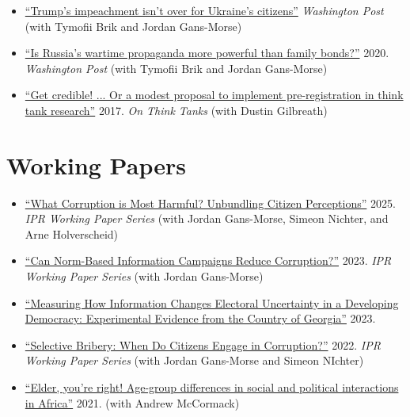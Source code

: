 \begin{itemize}[label={---},leftmargin=1.5em]
  \item \href{https://www.washingtonpost.com/politics/2020/02/19/trumps-impeachment-isnt-over-ukraines-citizens/}{``Trump’s impeachment isn’t over for Ukraine’s citizens''} \textit{Washington Post} (with Tymofii Brik and Jordan Gans-Morse)

  \item \href{https://www.washingtonpost.com/politics/2022/06/20/russia-ukraine-relatives-conversations-propaganda/}{``Is Russia’s wartime propaganda more powerful than family bonds?''} 2020. \textit{Washington Post} (with Tymofii Brik and Jordan Gans-Morse)

  \item \href{https://crrc-caucasus.blogspot.com/2017/09/get-credible-or-modest-proposal-to.html}{``Get credible! ... Or a modest proposal to implement pre-registration in think tank research''} 2017. \textit{On Think Tanks} (with Dustin Gilbreath)

\end{itemize}

\section{\sc Working Papers}

\begin{itemize}[label={---},leftmargin=1.5em]
  \item \href{https://www.ipr.northwestern.edu/documents/working-papers/2025/wp-25-02.pdf}{``What Corruption is Most Harmful? Unbundling Citizen Perceptions''} 2025. \textit{IPR Working Paper Series} (with Jordan Gans-Morse, Simeon Nichter, and Arne Holverscheid)

  \item \href{https://www.ipr.northwestern.edu/documents/working-papers/2023/wp-23-33.pdf}{``Can Norm-Based Information Campaigns Reduce Corruption?''} 2023. \textit{IPR Working Paper Series} (with Jordan Gans-Morse)

  \item \href{https://osf.io/mwg7u_v1/}{``Measuring How Information Changes Electoral Uncertainty in a Developing Democracy: Experimental Evidence from the Country of Georgia''} 2023.

  \item \href{https://www.ipr.northwestern.edu/documents/working-papers/2022/wp-22-28.pdf}{``Selective Bribery: When Do Citizens Engage in Corruption?''} 2022. \textit{IPR Working Paper Series} (with Jordan Gans-Morse and Simeon NIchter)

  \item \href{https://www.afrobarometer.org/publication/wp185-age-group-differences-social-and-political-interactions-africa/}{``Elder, you’re right! Age-group differences in social and political interactions in Africa''} 2021. (with Andrew McCormack)

\end{itemize}
